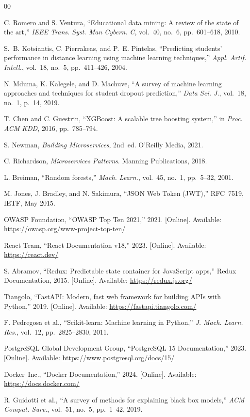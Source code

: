 \documentclass[conference]{IEEEtran}
\begin{document}
\begin{thebibliography}{00}

C. Romero and S. Ventura, ``Educational data mining: A review of the state of
the art,'' \textit{IEEE Trans. Syst. Man Cybern. C}, vol.~40, no.~6,
pp.~601--618, 2010.

S.~B. Kotsiantis, C. Pierrakeas, and P.~E. Pintelas, ``Predicting students'
performance in distance learning using machine learning techniques,''
\textit{Appl. Artif. Intell.}, vol.~18, no.~5, pp.~411--426, 2004.

N. Mduma, K. Kalegele, and D. Machuve, ``A survey of machine learning
approaches and techniques for student dropout prediction,'' \textit{Data Sci.
J.}, vol.~18, no.~1, p.~14, 2019.

T. Chen and C. Guestrin, ``XGBoost: A scalable tree boosting system,'' in
\textit{Proc. ACM KDD}, 2016, pp.~785--794.

S. Newman, \textit{Building Microservices}, 2nd~ed. O'Reilly Media, 2021.

C. Richardson, \textit{Microservices Patterns}. Manning Publications, 2018.

L. Breiman, ``Random forests,'' \textit{Mach. Learn.}, vol.~45, no.~1,
pp.~5--32, 2001.

M. Jones, J. Bradley, and N. Sakimura, ``JSON Web Token (JWT),'' RFC~7519,
IETF, May 2015.

OWASP Foundation, ``OWASP Top Ten 2021,'' 2021. [Online]. Available:
\url{https://owasp.org/www-project-top-ten/}

React Team, ``React Documentation v18,'' 2023. [Online]. Available:
\url{https://react.dev/}

S. Abramov, ``Redux: Predictable state container for JavaScript apps,'' Redux
Documentation, 2015. [Online]. Available: \url{https://redux.js.org/}

Tiangolo, ``FastAPI: Modern, fast web framework for building APIs with
Python,'' 2019. [Online]. Available: \url{https://fastapi.tiangolo.com/}

F. Pedregosa et al., ``Scikit-learn: Machine learning in Python,'' \textit{J.
Mach. Learn. Res.}, vol.~12, pp.~2825--2830, 2011.

PostgreSQL Global Development Group, ``PostgreSQL 15 Documentation,'' 2023.
[Online]. Available: \url{https://www.postgresql.org/docs/15/}

Docker~Inc., ``Docker Documentation,'' 2024. [Online]. Available:
\url{https://docs.docker.com/}

R. Guidotti et al., ``A survey of methods for explaining black box models,''
\textit{ACM Comput. Surv.}, vol.~51, no.~5, pp.~1--42, 2019.

\end{thebibliography}
\end{document}
